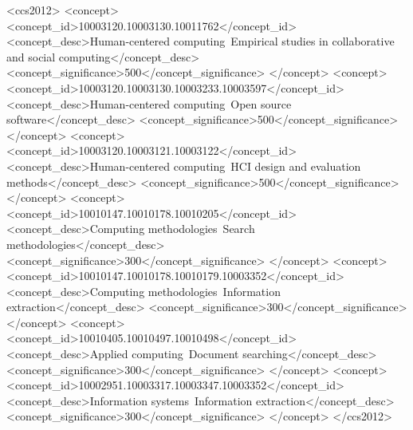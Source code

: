 \documentclass[acmsmall]{acmart}
\begin{document}
\begin{abstract}
\end{abstract}

\begin{CCSXML}
<ccs2012>
   <concept>
       <concept_id>10003120.10003130.10011762</concept_id>
       <concept_desc>Human-centered computing~Empirical studies in collaborative and social computing</concept_desc>
       <concept_significance>500</concept_significance>
       </concept>
   <concept>
       <concept_id>10003120.10003130.10003233.10003597</concept_id>
       <concept_desc>Human-centered computing~Open source software</concept_desc>
       <concept_significance>500</concept_significance>
       </concept>
   <concept>
       <concept_id>10003120.10003121.10003122</concept_id>
       <concept_desc>Human-centered computing~HCI design and evaluation methods</concept_desc>
       <concept_significance>500</concept_significance>
       </concept>
   <concept>
       <concept_id>10010147.10010178.10010205</concept_id>
       <concept_desc>Computing methodologies~Search methodologies</concept_desc>
       <concept_significance>300</concept_significance>
       </concept>
   <concept>
       <concept_id>10010147.10010178.10010179.10003352</concept_id>
       <concept_desc>Computing methodologies~Information extraction</concept_desc>
       <concept_significance>300</concept_significance>
       </concept>
   <concept>
       <concept_id>10010405.10010497.10010498</concept_id>
       <concept_desc>Applied computing~Document searching</concept_desc>
       <concept_significance>300</concept_significance>
       </concept>
   <concept>
       <concept_id>10002951.10003317.10003347.10003352</concept_id>
       <concept_desc>Information systems~Information extraction</concept_desc>
       <concept_significance>300</concept_significance>
       </concept>
 </ccs2012>
\end{CCSXML}



\end{document}
